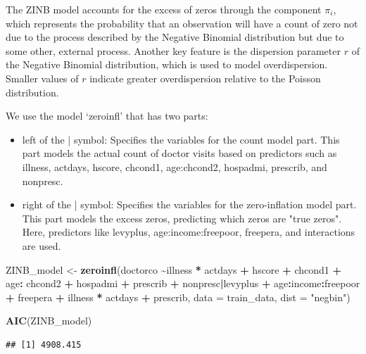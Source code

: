 \documentclass[
]{article}
\newenvironment{Shaded}{\begin{snugshade}}{\end{snugshade}}
\newcommand{\AttributeTok}[1]{\textcolor[rgb]{0.13,0.29,0.53}{#1}}
\newcommand{\FunctionTok}[1]{\textcolor[rgb]{0.13,0.29,0.53}{\textbf{#1}}}
\newcommand{\NormalTok}[1]{#1}
\newcommand{\OtherTok}[1]{\textcolor[rgb]{0.56,0.35,0.01}{#1}}
\newcommand{\SpecialCharTok}[1]{\textcolor[rgb]{0.81,0.36,0.00}{\textbf{#1}}}
\newcommand{\StringTok}[1]{\textcolor[rgb]{0.31,0.60,0.02}{#1}}
\begin{document}
The ZINB model accounts for the excess of zeros through the component
\(\pi_i\), which represents the probability that an observation will
have a count of zero not due to the process described by the Negative
Binomial distribution but due to some other, external process. Another
key feature is the dispersion parameter \(r\) of the Negative Binomial
distribution, which is used to model overdispersion. Smaller values of
\(r\) indicate greater overdispersion relative to the Poisson
distribution.

We use the model `zeroinfl' that has two parts:

\begin{itemize}
\item left of the | symbol: Specifies the variables for the count model part. This part models the actual count of doctor visits based on predictors such as illness, actdays, hscore, chcond1, age:chcond2, hospadmi, prescrib, and nonpresc.
\item right of the | symbol: Specifies the variables for the zero-inflation model part. This part models the excess zeros, predicting which zeros are "true zeros". Here, predictors like levyplus, age:income:freepoor, freepera, and interactions are used.
\end{itemize}

\begin{Shaded}
\begin{Highlighting}[]
\NormalTok{ZINB\_model }\OtherTok{\textless{}{-}} \FunctionTok{zeroinfl}\NormalTok{(doctorco }\SpecialCharTok{\textasciitilde{}}\NormalTok{illness }\SpecialCharTok{*}\NormalTok{ actdays }\SpecialCharTok{+}\NormalTok{ hscore }\SpecialCharTok{+}\NormalTok{ chcond1 }\SpecialCharTok{+}\NormalTok{ age}\SpecialCharTok{:}\NormalTok{ chcond2 }
\SpecialCharTok{+}\NormalTok{ hospadmi  }\SpecialCharTok{+}\NormalTok{ prescrib }\SpecialCharTok{+}\NormalTok{ nonpresc}\SpecialCharTok{|}\NormalTok{levyplus }\SpecialCharTok{+}\NormalTok{ age}\SpecialCharTok{:}\NormalTok{income}\SpecialCharTok{:}\NormalTok{freepoor }\SpecialCharTok{+}\NormalTok{ freepera}
\SpecialCharTok{+}\NormalTok{ illness }\SpecialCharTok{*}\NormalTok{ actdays }\SpecialCharTok{+}\NormalTok{ prescrib, }\AttributeTok{data =}\NormalTok{ train\_data, }\AttributeTok{dist =} \StringTok{"negbin"}\NormalTok{)}

\FunctionTok{AIC}\NormalTok{(ZINB\_model)}
\end{Highlighting}
\end{Shaded}

\begin{verbatim}
## [1] 4908.415
\end{verbatim}
\end{document}
